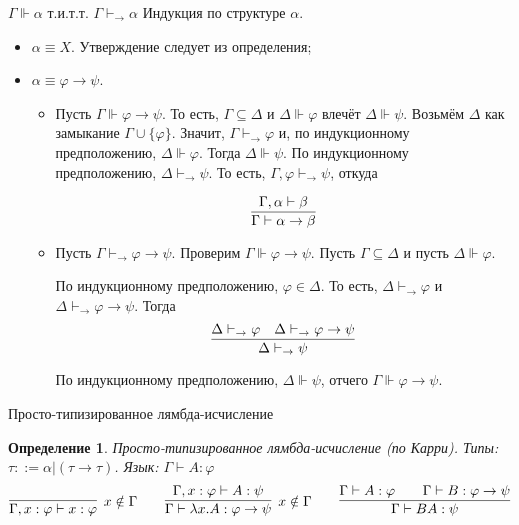 \documentclass[aspectratio=169]{beamer}
\newtheorem{dfn}{Определение}[section]
\begin{document}
\begin{frame}{$\Gamma\Vdash \alpha$ т.и.т.т. $\Gamma\vdash_\rightarrow\alpha$}
Индукция по структуре $\alpha$.
\begin{itemize}
\item $\alpha \equiv X$. Утверждение следует из определения;
\item $\alpha \equiv \varphi\rightarrow\psi$. 
\begin{itemize}

\item Пусть $\Gamma\Vdash \varphi\rightarrow\psi$. То есть, $\Gamma \subseteq \Delta$ и $\Delta \Vdash \varphi$
влечёт $\Delta \Vdash \psi$.
Возьмём $\Delta$ как замыкание $\Gamma\cup\{\varphi\}$. Значит, $\Gamma\vdash_\rightarrow\varphi$
 и, по индукционному предположению, $\Delta\Vdash\varphi$.
Тогда $\Delta\Vdash\psi$. По индукционному предположению, $\Delta\vdash_\rightarrow\psi$. 
То есть, $\Gamma,\varphi\vdash_\rightarrow\psi$, откуда

$$\infer{\Gamma\vdash\alpha\rightarrow\beta}{\Gamma,\alpha\vdash\beta}$$
\item Пусть $\Gamma\vdash_\rightarrow\varphi\rightarrow\psi$. Проверим $\Gamma\Vdash\varphi\rightarrow\psi$.
Пусть $\Gamma \subseteq \Delta$ и пусть $\Delta\Vdash\varphi$. 

По индукционному предположению, $\varphi\in\Delta$.
То есть, $\Delta\vdash_\rightarrow\varphi$ и $\Delta\vdash_\rightarrow\varphi\rightarrow\psi$.
Тогда $$\infer{\Delta\vdash_\rightarrow\psi}{\Delta\vdash_\rightarrow\varphi\quad\Delta\vdash_\rightarrow\varphi\rightarrow\psi}$$

По индукционному предположению, $\Delta\Vdash\psi$, отчего $\Gamma\Vdash\varphi\rightarrow\psi$.
\end{itemize}
\end{itemize}
\end{frame}

\begin{frame}{Просто-типизированное лямбда-исчисление}
\begin{dfn}
Просто-типизированное лямбда-исчисление (по Карри). \pause Типы: $\tau ::= \alpha | (\tau\rightarrow\tau)$. \pause Язык: $\Gamma\vdash A:\varphi$
$$\infer[x \notin \Gamma]{\Gamma,x:\varphi \vdash x:\varphi}{} \quad\quad 
  \infer[x \notin \Gamma]{\Gamma\vdash \lambda x.A: \varphi\rightarrow\psi}{\Gamma,x:\varphi\vdash A:\psi} \quad\quad 
  \infer{\Gamma\vdash B A:\psi}{\Gamma\vdash A:\varphi\quad\quad\Gamma\vdash B:\varphi\rightarrow\psi}$$
\end{dfn}
\end{frame}
\end{document}
